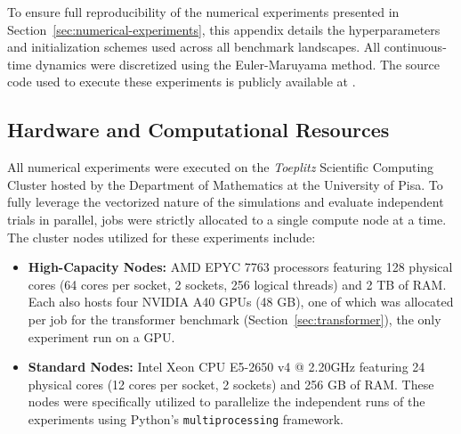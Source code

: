 \documentclass{article}
\theoremstyle{plain}
\theoremstyle{definition}
\theoremstyle{remark}
\begin{document}
To ensure full reproducibility of the numerical experiments presented in Section~\ref{sec:numerical-experiments}, this appendix details the hyperparameters and initialization schemes used across all benchmark landscapes. All continuous-time dynamics were discretized using the Euler-Maruyama method. The source code used to execute these experiments is publicly available at \cite{softmin_energy_2026}.

\subsection{Hardware and Computational Resources}
All numerical experiments were executed on the \emph{Toeplitz} Scientific Computing Cluster hosted by the Department of Mathematics at the University of Pisa. To fully leverage the vectorized nature of the simulations and evaluate independent trials in parallel, jobs were strictly allocated to a single compute node at a time. The cluster nodes utilized for these experiments include:
\begin{itemize}
    \item \textbf{High-Capacity Nodes:} AMD EPYC 7763 processors featuring 128 physical cores (64 cores per socket, 2 sockets, 256 logical threads) and 2 TB of RAM. Each also hosts four NVIDIA A40 GPUs (48 GB), one of which was allocated per job for the transformer benchmark (Section~\ref{sec:transformer}), the only experiment run on a GPU.
    \item \textbf{Standard Nodes:} Intel Xeon CPU E5-2650 v4 @ 2.20GHz featuring 24 physical cores (12 cores per socket, 2 sockets) and 256 GB of RAM. These nodes were specifically utilized to parallelize the independent runs of the experiments using Python's \texttt{multiprocessing} framework.
\end{itemize}
\end{document}
